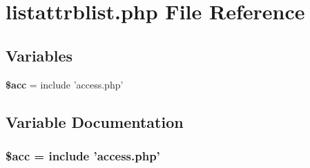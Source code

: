\section{listattrblist.php File Reference}
\label{listattrblist_8php}


\subsection*{Variables}
\begin{CompactItemize}
\item 
{\bf \$acc} = include 'access.php'
\end{CompactItemize}


\subsection{Variable Documentation}
\subsubsection{\setlength{\rightskip}{0pt plus 5cm}\$acc = include 'access.php'}\label{listattrblist_8php_542926c588a05eb69553d79c83cf73da}



